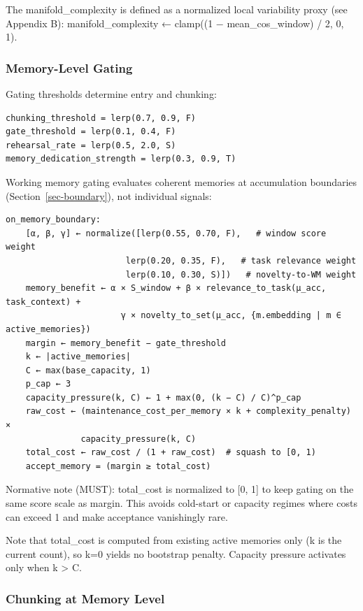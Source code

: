 \documentclass[
  letterpaper,
  DIV=11,
  numbers=noendperiod]{scrartcl}
\begin{document}
The manifold\_complexity is defined as a normalized local variability
proxy (see Appendix B): manifold\_complexity ← clamp((1 −
mean\_cos\_window) / 2, 0, 1).

\subsubsection{Memory-Level Gating}\label{memory-level-gating}

Gating thresholds determine entry and chunking:

\begin{verbatim}
chunking_threshold = lerp(0.7, 0.9, F)
gate_threshold = lerp(0.1, 0.4, F)
rehearsal_rate = lerp(0.5, 2.0, S)
memory_dedication_strength = lerp(0.3, 0.9, T)
\end{verbatim}

Working memory gating evaluates coherent memories at accumulation
boundaries (Section~\ref{sec-boundary}), not individual signals:

\begin{verbatim}
on_memory_boundary:
    [α, β, γ] ← normalize([lerp(0.55, 0.70, F),   # window score weight
                        lerp(0.20, 0.35, F),   # task relevance weight
                        lerp(0.10, 0.30, S)])   # novelty-to-WM weight
    memory_benefit ← α × S_window + β × relevance_to_task(μ_acc, task_context) +
                       γ × novelty_to_set(μ_acc, {m.embedding | m ∈ active_memories})
    margin ← memory_benefit − gate_threshold
    k ← |active_memories|
    C ← max(base_capacity, 1)
    p_cap ← 3
    capacity_pressure(k, C) ← 1 + max(0, (k − C) / C)^p_cap
    raw_cost ← (maintenance_cost_per_memory × k + complexity_penalty) ×
               capacity_pressure(k, C)
    total_cost ← raw_cost / (1 + raw_cost)  # squash to [0, 1)
    accept_memory = (margin ≥ total_cost)
\end{verbatim}

Normative note (MUST): total\_cost is normalized to {[}0, 1{]} to keep
gating on the same score scale as margin. This avoids cold-start or
capacity regimes where costs can exceed 1 and make acceptance
vanishingly rare.

Note that total\_cost is computed from existing active memories only (k
is the current count), so k=0 yields no bootstrap penalty. Capacity
pressure activates only when k \textgreater{} C.

\subsubsection{Chunking at Memory Level}\label{chunking-at-memory-level}
\end{document}
